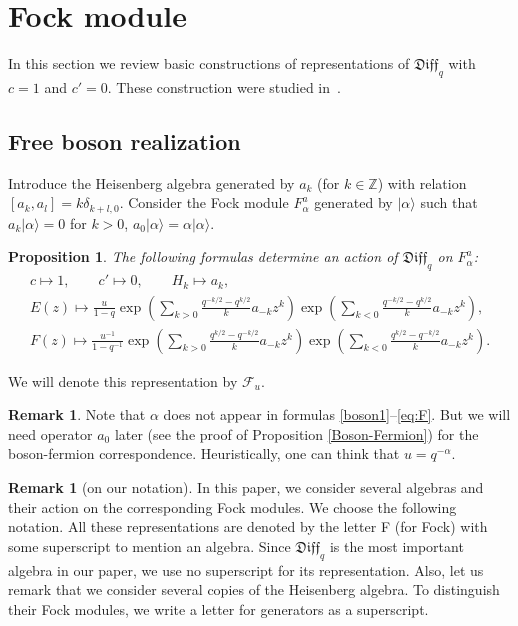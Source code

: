 \documentclass[pdftex]{sigma}
\numberwithin{equation}{section}
\newtheorem{Proposition}[Theorem]{Proposition}
\theoremstyle{definition}
\newtheorem{Remark}[Theorem]{Remark}
\newcommand{\qD}{\mathfrak{Diff}_q}
\begin{document}
\section{Fock module} \label{level1}
In this section we review basic constructions of representations of $\qD$ with $c=1$ and $c'=0$. These construction were studied in~\cite{GL}.

\subsection{Free boson realization} \label{boson}

Introduce the Heisenberg algebra generated by $a_k$ (for $k \in \mathbb{Z}$) with relation $[a_k, a_l] = k \delta_{k+l, 0}$. Consider the Fock module $F_{\alpha}^a$ generated by $| \alpha \rangle$ such that $a_k | \alpha \rangle = 0$ for $k > 0$, $a_0 | \alpha \rangle = \alpha | \alpha \rangle$.
\begin{Proposition} \label{prop:sec3 Boson Fock}
The following formulas
determine an action of $\qD$ on $F_{\alpha}^a$:
\begin{gather}
c \mapsto 1, \qquad c' \mapsto 0, \qquad H_k \mapsto a_k, \label{boson1}\\
E(z) \mapsto \frac{u}{1-q} \exp \left( \sum_{k>0} \frac{q^{-k/2}-q^{k/2}}{k} a_{-k} z^k \right) \exp \left( \sum_{k<0} \frac{q^{-k/2}-q^{k/2}}{k} a_{-k} z^k \right) \label{eq:E},\\
F(z) \mapsto \frac{u^{-1}}{1-q^{-1}} \exp \left( \sum_{k>0} \frac{q^{k/2}-q^{-k/2}}{k} a_{-k} z^k \right) \exp \left( \sum_{k<0}\frac{q^{k/2}-q^{-k/2}}{k} a_{-k} z^k \right). \label{eq:F}
\end{gather}
\end{Proposition}

We will denote this representation by $\mathcal{F}_u$.

\begin{Remark} \label{remark:NOalpha}Note that $\alpha$ does not appear in formulas \eqref{boson1}--\eqref{eq:F}. But we will need operator $a_0$ later (see the proof of Proposition \ref{Boson-Fermion}) for the boson-fermion correspondence. Heuristically, one can think that $u = q^{-\alpha}$.
\end{Remark}

\begin{Remark}[on our notation]In this paper, we consider several algebras and their action on the corresponding Fock modules. We choose the following notation. All these representations are denoted by the letter F (for Fock) with some superscript to mention an algebra. Since $\qD$ is the most important algebra in our paper, we use no superscript for its representation.
Also, let us remark that we consider several copies of the Heisenberg algebra. To distinguish their Fock modules, we write a letter for generators as a superscript.
\end{Remark}
\end{document}

